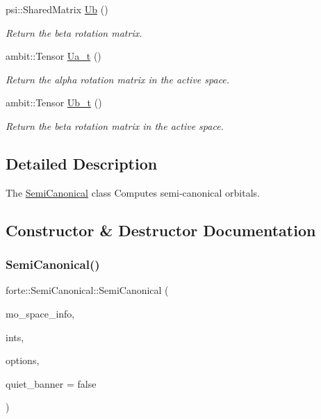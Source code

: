 \begin{DoxyCompactItemize}
psi\+::\+Shared\+Matrix \mbox{\hyperlink{classforte_1_1_semi_canonical_a3e7fd1795a15e6c0515e33e8fc62a257}{Ub}} ()
\begin{DoxyCompactList}\small\item\em Return the beta rotation matrix. \end{DoxyCompactList}\item 
ambit\+::\+Tensor \mbox{\hyperlink{classforte_1_1_semi_canonical_ae526c7593f6d9ff4350c513b6bc6fcce}{Ua\+\_\+t}} ()
\begin{DoxyCompactList}\small\item\em Return the alpha rotation matrix in the active space. \end{DoxyCompactList}\item 
ambit\+::\+Tensor \mbox{\hyperlink{classforte_1_1_semi_canonical_aa36c3435c15beab082a8e14e054b3f13}{Ub\+\_\+t}} ()
\begin{DoxyCompactList}\small\item\em Return the beta rotation matrix in the active space. \end{DoxyCompactList}\end{DoxyCompactItemize}


\subsection{Detailed Description}
The \mbox{\hyperlink{classforte_1_1_semi_canonical}{Semi\+Canonical}} class Computes semi-\/canonical orbitals. 

\subsection{Constructor \& Destructor Documentation}
\mbox{\label{classforte_1_1_semi_canonical_a1da094393f823666e7b346bb53b504e2}} 
\subsubsection{\texorpdfstring{Semi\+Canonical()}{SemiCanonical()}}
{\footnotesize\ttfamily forte\+::\+Semi\+Canonical\+::\+Semi\+Canonical (\begin{DoxyParamCaption}\item[{std\+::shared\+\_\+ptr$<$ \mbox{\hyperlink{classforte_1_1_m_o_space_info}{M\+O\+Space\+Info}} $>$}]{mo\+\_\+space\+\_\+info,  }\item[{std\+::shared\+\_\+ptr$<$ \mbox{\hyperlink{classforte_1_1_forte_integrals}{Forte\+Integrals}} $>$}]{ints,  }\item[{std\+::shared\+\_\+ptr$<$ \mbox{\hyperlink{classforte_1_1_forte_options}{Forte\+Options}} $>$}]{options,  }\item[{bool}]{quiet\+\_\+banner = {\ttfamily false} }\end{DoxyParamCaption})}



